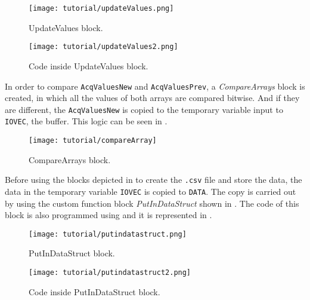 \begin{figure}[H] \centering
 \texttt{[image: tutorial/updateValues.png]}
  \caption{UpdateValues block.}
  \label{fig:updateValuesBlock}
\end{figure}

\begin{figure}[H] \centering
 \texttt{[image: tutorial/updateValues2.png]}
  \caption{Code inside UpdateValues block.}
  \label{fig:updateValuesBlockCode}
\end{figure}

In order to compare \verb|AcqValuesNew| and \verb|AcqValuesPrev|, a
\emph{CompareArrays} block is created, in which all the values of both arrays are compared
bitwise. And if they are different, the
\verb|AcqValuesNew| is copied to the temporary variable input to \verb|IOVEC|, the buffer.
This logic can be seen in .

\begin{figure}[H] \centering
 \texttt{[image: tutorial/compareArray]}
  \caption{CompareArrays block.}
  \label{fig:compareArrayBlock}
\end{figure}

Before using the blocks depicted in  to create the \verb|.csv| file and store the data, the data in the temporary
variable \verb|IOVEC| is copied to \verb|DATA|. The copy is carried out by using the custom function block
\emph{PutInDataStruct} shown in . The code of this block is also programmed using \SCL{} and it is represented in .  

\begin{figure}[H] \centering
 \texttt{[image: tutorial/putindatastruct.png]}
  \caption{PutInDataStruct block.}
  \label{fig:putInDataStructBlock}
\end{figure}

\begin{figure}[H] \centering
 \texttt{[image: tutorial/putindatastruct2.png]}
  \caption{Code inside PutInDataStruct block.}
  \label{fig:putInDataStructBlockCode}
\end{figure}

